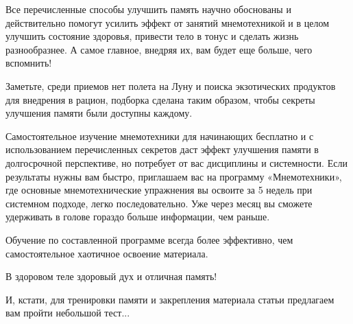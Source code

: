 Все перечисленные способы улучшить память научно обоснованы и действительно помогут усилить эффект от занятий мнемотехникой и в целом улучшить состояние здоровья, привести тело в тонус и сделать жизнь разнообразнее. А самое главное, внедряя их, вам будет еще больше, чего вспомнить!

Заметьте, среди приемов нет полета на Луну и поиска экзотических продуктов для внедрения в рацион, подборка сделана таким образом, чтобы секреты улучшения памяти были доступны каждому.

Самостоятельное изучение мнемотехники для начинающих бесплатно и с использованием перечисленных секретов даст эффект улучшения памяти в долгосрочной перспективе, но потребует от вас дисциплины и системности. Если результаты нужны вам быстро, приглашаем вас на программу «Мнемотехники», где основные мнемотехнические упражнения вы освоите за 5 недель при системном подходе, легко последовательно. Уже через месяц вы сможете удерживать в голове гораздо больше информации, чем раньше.

Обучение по составленной программе всегда более эффективно, чем самостоятельное хаотичное освоение материала.

В здоровом теле здоровый дух и отличная память!

И, кстати, для тренировки памяти и закрепления материала статьи предлагаем вам пройти небольшой тест...